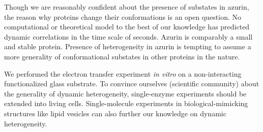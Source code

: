 Though we are reasonably confident about the presence of substates in azurin, the reason why proteins change their conformations is an open question. No computational or theoretical model to the best of our knowledge has predicted dynamic correlations in the time scale of seconds. Azurin is comparably a small and stable protein. Presence of heterogeneity in azurin is tempting to assume a more generality of conformational substates in other proteins in the nature.

We performed the electron transfer experiment \textit{in vitro} on a non-interacting functionalized glass substrate. To convince ourselves (scientific community) about the generality of dynamic heterogeneity, single-enzyme experiments should be extended into living cells. Single-molecule experiments in biological-mimicking structures like lipid vesicles can also further our knowledge on dynamic heterogeneity.